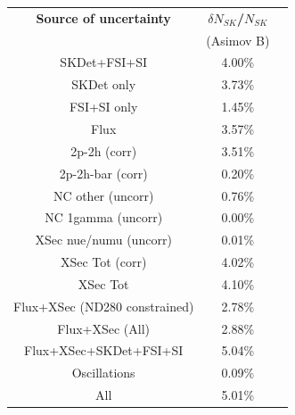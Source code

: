 


\begin{table}[htb]
\centering
\begin{tabular}{| c | c | c |}
\hline
  {\bf Source of uncertainty}    & \multicolumn{1}{c|}{{\bf ${\delta}N_{SK}$/$N_{SK}$}}\\
                                 & \multicolumn{1}{c|}{(Asimov B)}\\

\hline
\hline  
SKDet+FSI+SI                   & 4.00\%                        \\
SKDet only                   & 3.73\%                        \\
FSI+SI only                   & 1.45\%                        \\
\hline
  Flux                           & 3.57\%                        \\
\hline
\hline
  2p-2h (corr)                     & 3.51\%                        \\
  2p-2h-bar (corr)                  & 0.20\%                        \\
  NC other (uncorr)              & 0.76\%                        \\
  NC 1gamma (uncorr)             & 0.00\%                        \\
  XSec nue/numu (uncorr)                 & 0.01\%                        \\
\hline  
  XSec Tot (corr)                  & 4.02\%                        \\
  XSec Tot                       & 4.10\%                        \\
\hline
\hline
  Flux+XSec (ND280 constrained)                      & 2.78\%                        \\
  Flux+XSec (All)                      				& 2.88\%                        \\
\hline
  Flux+XSec+SKDet+FSI+SI         & 5.04\%                        \\
\hline
\hline
  Oscillations                   & 0.09\%                        \\
\hline
\hline
  All                            & 5.01\%                        \\
\hline
\hline


\end{tabular}
\end{table}
